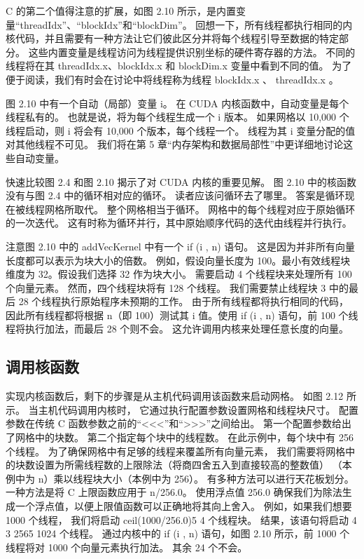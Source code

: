 C 的第二个值得注意的扩展，如图 2.10 所示，是内置变量“threadIdx”、“blockIdx”和“blockDim”。 
回想一下，所有线程都执行相同的内核代码，并且需要有一种方法让它们彼此区分并将每个线程引导至数据的特定部分。 
这些内置变量是线程访问为线程提供识别坐标的硬件寄存器的方法。 
不同的线程将在其 threadIdx.x、blockIdx.x 和 blockDim.x 变量中看到不同的值。 
为了便于阅读，我们有时会在讨论中将线程称为线程 blockIdx.x 、 threadIdx.x 。

图 2.10 中有一个自动（局部）变量 i。 在 CUDA 内核函数中，自动变量是每个线程私有的。 
也就是说，将为每个线程生成一个 i 版本。 如果网格以 10,000 个线程启动，则 i 将会有 10,000 个版本，每个线程一个。 
线程为其 i 变量分配的值对其他线程不可见。 我们将在第 5 章“内存架构和数据局部性”中更详细地讨论这些自动变量。

快速比较图 2.4 和图 2.10 揭示了对 CUDA 内核的重要见解。 图 2.10 中的核函数没有与图 2.4 中的循环相对应的循环。 
读者应该问循环去了哪里。 答案是循环现在被线程网格所取代。 整个网格相当于循环。 网格中的每个线程对应于原始循环的一次迭代。 
这有时称为循环并行，其中原始顺序代码的迭代由线程并行执行。

注意图 2.10 中的 addVecKernel 中有一个 if (i , n) 语句。 这是因为并非所有向量长度都可以表示为块大小的倍数。 
例如，假设向量长度为 100。最小有效线程块维度为 32。假设我们选择 32 作为块大小。 
需要启动 4 个线程块来处理所有 100 个向量元素。 然而，四个线程块将有 128 个线程。 
我们需要禁止线程块 3 中的最后 28 个线程执行原始程序未预期的工作。 由于所有线程都将执行相同的代码，
因此所有线程都将根据 n（即 100）测试其 i 值。使用 if (i , n) 语句，前 100 个线程将执行加法，而最后 28 个则不会。 
这允许调用内核来处理任意长度的向量。

\subsection{调用核函数}
实现内核函数后，剩下的步骤是从主机代码调用该函数来启动网格。 如图 2.12 所示。 当主机代码调用内核时，
它通过执行配置参数设置网格和线程块尺寸。 配置参数在传统 C 函数参数之前的“<<<”和“>>>”之间给出。 
第一个配置参数给出了网格中的块数。 第二个指定每个块中的线程数。 在此示例中，每个块中有 256 个线程。 
为了确保网格中有足够的线程来覆盖所有向量元素，
我们需要将网格中的块数设置为所需线程数的上限除法（将商四舍五入到直接较高的整数值） 
（本例中为 n）乘以线程块大小（本例中为 256）。 有多种方法可以进行天花板划分。 一种方法是将 C 上限函数应用于 n/256.0。 
使用浮点值 256.0 确保我们为除法生成一个浮点值，以便上限值函数可以正确地将其向上舍入。 例如，如果我们想要 1000 个线程，
我们将启动 ceil(1000/256.0)5 4 个线程块。 结果，该语句将启动 4 3 2565 1024 个线程。 
通过内核中的 if (i , n) 语句，如图 2.10 所示，前 1000 个线程将对 1000 个向量元素执行加法。 其余 24 个不会。

